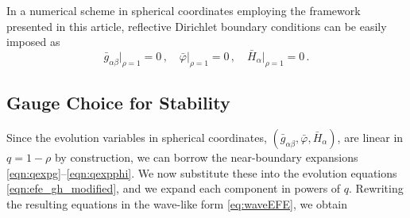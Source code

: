 \documentclass[a4paper,11pt]{article}
\numberwithin{equation}{section}
\begin{document}
In a numerical scheme in spherical coordinates employing the framework presented in this article, reflective Dirichlet boundary conditions can be easily imposed as
\begin{equation}
\label{eq:dirbc_sphcoords}
 \bar{g}_{\alpha\beta}\big|_{\rho=1}=0\,,\quad \bar{\varphi}\big|_{\rho=1}=0\,,\quad \bar{H}_\alpha\big|_{\rho=1}=0\,.
 \end{equation}

\subsection{Gauge Choice for Stability}\label{sec:gau_choice_sphcoords}

Since the evolution variables in spherical coordinates, $(\bar{g}_{\alpha\beta},\bar{\varphi},\bar{H}_\alpha)$, are linear in $q=1-\rho$ by construction, we can borrow the near-boundary expansions \eqref{eqn:qexpg}--\eqref{eqn:qexpphi}. 
We now substitute these into the evolution equations \eqref{eqn:efe_gh_modified}, and we expand each component in powers of $q$. Rewriting the resulting equations in the wave-like form \eqref{eq:waveEFE}, we obtain
\end{document}
